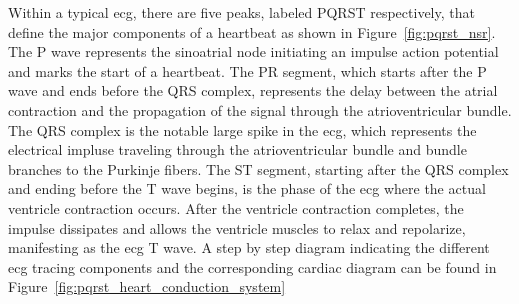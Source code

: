 \documentclass[\main/thesis.tex]{subfiles}
\begin{document}
Within a typical \gls{ecg}, there are five peaks, labeled PQRST respectively, that define the major components of a heartbeat as shown in Figure~\ref{fig:pqrst_nsr}.
The P wave represents the sinoatrial node initiating an impulse action potential and marks the start of a heartbeat.
The PR segment, which starts after the P wave and ends before the QRS complex, represents the delay between the atrial contraction and the propagation of the signal through the atrioventricular bundle.
The QRS complex is the notable large spike in the \gls{ecg}, which represents the electrical impluse traveling through the atrioventricular bundle and bundle branches to the Purkinje fibers.
The ST segment, starting after the QRS complex and ending before the T wave begins, is the phase of the \gls{ecg} where the actual ventricle contraction occurs.
After the ventricle contraction completes, the impulse dissipates and allows the ventricle muscles to relax and repolarize, manifesting as the \gls{ecg} T wave.
A step by step diagram indicating the different \gls{ecg} tracing components and the corresponding cardiac diagram can be found in Figure~\ref{fig:pqrst_heart_conduction_system}
\end{document}
